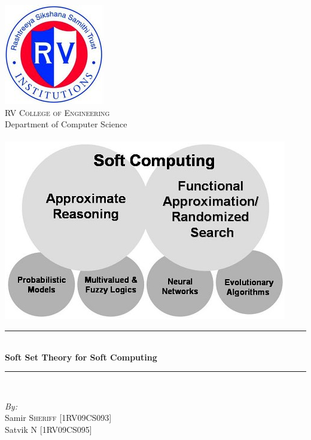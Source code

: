 \documentclass[12pt]{article} %
\title{}
\newcommand{\HRule}{\rule{\linewidth}{0.5mm}}
\begin{document}
\maketitle
\begin{titlepage}

\begin{center}


\includegraphics[scale=0.75]{RVCE.png}\\[1cm]    

\textsc{\LARGE  RV College of Engineering}\\[0.5cm]
\large{Department of Computer Science}\\[1cm]
\textsc{\Large }\\[0.5cm]

\includegraphics[scale=1]{softee.png}\\[1cm]    

\HRule \\[0.4cm]
{  \huge\bfseries Soft Set Theory for Soft Computing }\\[0.4cm]

\HRule \\[1cm]

\begin{minipage}{0.8\textwidth}
\begin{flushleft} \large
\emph{By:}\\
Samir \textsc{Sheriff} [1RV09CS093]\\
Satvik \textsc{N} [1RV09CS095]\\


\end{flushleft}
\end{minipage}
\vfill

{\large}

\end{center}

\end{titlepage}
\end{document}
